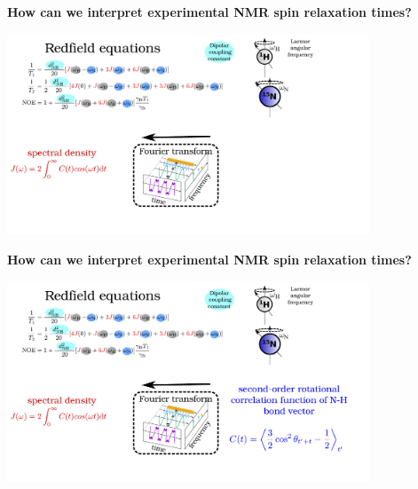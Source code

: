 \documentclass{beamer}
\begin{document}
\addtocounter{framenumber}{-1}
\begin{frame}
\begin{center}
\Large{\centering

\textbf{How can we interpret experimental NMR spin relaxation times?} \\}

\vspace{0.5cm}


\includegraphics[height=6cm]{redfield56.pdf}
\end{center}
\end{frame}

\addtocounter{framenumber}{-1}
\begin{frame}
\begin{center}
\Large{\centering

\textbf{How can we interpret experimental NMR spin relaxation times?} \\}

\vspace{0.5cm}


\includegraphics[height=6cm]{redfield6.pdf}
\end{center}
\end{frame}
\end{document}
